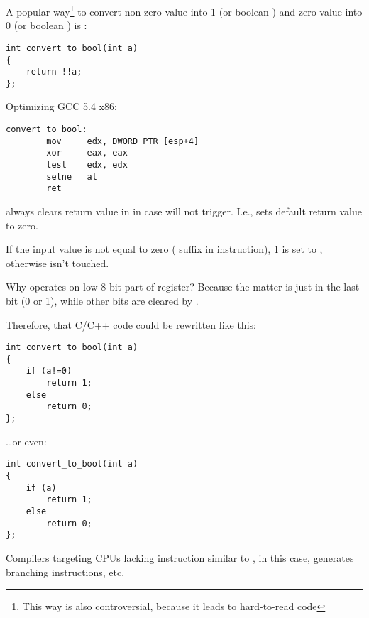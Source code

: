 
A popular way\footnote{This way is also controversial, because it leads to hard-to-read code} to convert non-zero value into 1 (or boolean ) and zero value into 0 (or boolean ) is :

\begin{lstlisting}
int convert_to_bool(int a)
{
	return !!a;
};
\end{lstlisting}

Optimizing GCC 5.4 x86:

\begin{lstlisting}
convert_to_bool:
        mov     edx, DWORD PTR [esp+4]
        xor     eax, eax
        test    edx, edx
        setne   al
        ret
\end{lstlisting}

 always clears return value in \EAX in case  will not trigger.
I.e.,  sets default return value to zero.

If the input value is not equal to zero ( suffix in  instruction),
1 is set to \AL, otherwise \AL isn't touched.

Why  operates on low 8-bit part of \EAX register?
Because the matter is just in the last bit (0 or 1), while other bits are cleared by .

Therefore, that C/C++ code could be rewritten like this:

\begin{lstlisting}
int convert_to_bool(int a)
{
	if (a!=0)
		return 1;
	else
		return 0;
};
\end{lstlisting}

\dots or even:

\begin{lstlisting}
int convert_to_bool(int a)
{
	if (a)
		return 1;
	else
		return 0;
};
\end{lstlisting}

Compilers targeting \ac{CPU}s lacking instruction similar to , in this case,
generates branching instructions, etc.

